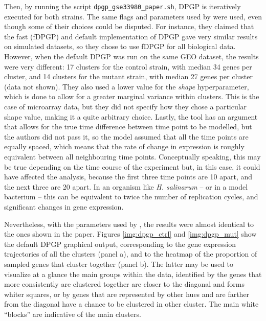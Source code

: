 Then, by running the script \texttt{dpgp\_gse33980\_paper.sh}, DPGP is iteratively executed for both strains. The same flags and parameters used by \citeauthor{mcdowellClusteringGeneExpression2018} were used, even though some of their choices could be disputed. For instance, they claimed that the fast (fDPGP) and default implementation of DPGP gave very similar results on simulated datasets, so they chose to use fDPGP for all biological data. However, when the default DPGP was run on the same GEO dataset, the results were very different: 17 clusters for the control strain, with median 34 genes per cluster, and 14 clusters for the mutant strain, with median 27 genes per cluster (data not shown). They also used a lower value for the \emph{shape} hyperparameter, which is done to allow for a greater marginal variance within clusters. This is the case of microarray data, but they did not specify how they chose a particular shape value, making it a quite arbitrary choice. Lastly, the tool has an argument that allows for the true time difference between time point to be modelled, but the authors did not pass it, so the model assumed that all the time points are equally spaced, which means that the rate of change in expression is roughly equivalent between all neighbouring time points. Conceptually speaking, this may be true depending on the time course of the experiment but, in this case, it could have affected the analysis, because the first three time points are \SI{10}{\min} apart, and the next three are \SI{20}{\min} apart. In an organism like \textit{H. salinarum} -- or in a model bacterium -- this can be equivalent to twice the number of replication cycles, and significant changes in gene expression.

Nevertheless, with the parameters used by \citeauthor{mcdowellClusteringGeneExpression2018}, the results were almost identical to the ones shown in the paper. Figures \ref{img:dpgp_ctrl} and \ref{img:dpgp_mut} show the default DPGP graphical output, corresponding to the gene expression trajectories of all the clusters (panel a), and to the heatmap of the proportion of sampled genes that cluster together (panel b). The latter may be used to visualize at a glance the main groups within the data, identified by the genes that more consistently are clustered together are closer to the diagonal and forms whiter squares, or by genes that are represented by other hues and are farther from the diagonal have a chance to be clustered in other cluster. The main white ``blocks'' are indicative of the main clusters.


